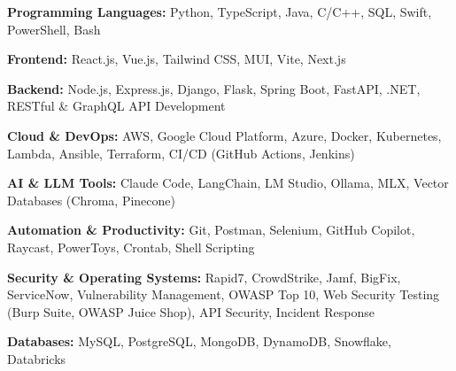 \textbf{Programming Languages:} Python, TypeScript, Java, C/C++, SQL, Swift, PowerShell, Bash

\vspace{3pt}
\textbf{Frontend:} React.js, Vue.js, Tailwind CSS, MUI, Vite, Next.js

\vspace{3pt}
\textbf{Backend:} Node.js, Express.js, Django, Flask, Spring Boot, FastAPI, .NET, RESTful \& GraphQL API Development

\vspace{3pt}
\textbf{Cloud \& DevOps:} AWS, Google Cloud Platform, Azure, Docker, Kubernetes, Lambda, Ansible, Terraform, CI/CD (GitHub Actions, Jenkins)

\vspace{3pt}
\textbf{AI \& LLM Tools:} Claude Code, LangChain, LM Studio, Ollama, MLX, Vector Databases (Chroma, Pinecone)

\vspace{3pt}
\textbf{Automation \& Productivity:} Git, Postman, Selenium, GitHub Copilot, Raycast, PowerToys, Crontab, Shell Scripting

\vspace{3pt}
\textbf{Security \& Operating Systems:} Rapid7, CrowdStrike, Jamf, BigFix, ServiceNow, Vulnerability Management, OWASP Top 10, Web Security Testing (Burp Suite, OWASP Juice Shop), API Security, Incident Response

\vspace{3pt}
\textbf{Databases:} MySQL, PostgreSQL, MongoDB, DynamoDB, Snowflake, Databricks